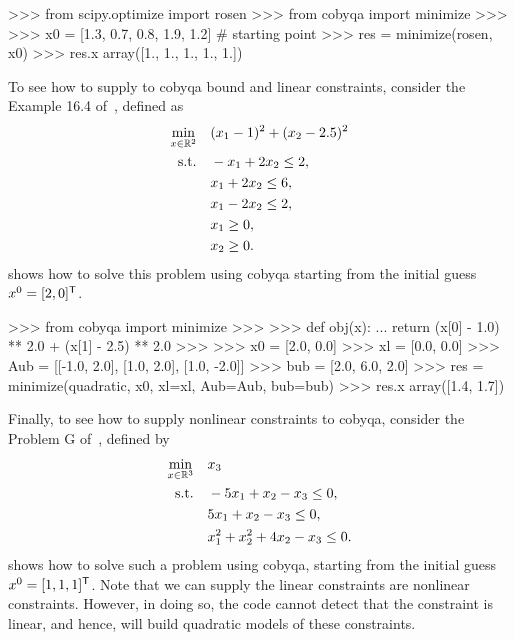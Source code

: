 \begin{lstpython}[%
    caption=Solving the Rosenbrock problem using \gls{cobyqa},
    label=lst:cobyqa-rosenbrock,
]
    >>> from scipy.optimize import rosen
    >>> from cobyqa import minimize
    >>>
    >>> x0 = [1.3, 0.7, 0.8, 1.9, 1.2]  # starting point
    >>> res = minimize(rosen, x0)
    >>> res.x
    array([1., 1., 1., 1., 1.]) 
\end{lstpython}

To see how to supply to \gls{cobyqa} bound and linear constraints, consider the Example 16.4 of~\cite{Nocedal_Wright_2006}, defined as
\begin{align*}
    \min_{\iter \in \R^2}   & \quad (\iter_1 - 1)^2 + (\iter_2 - 2.5)^2\\
    \text{s.t.}             & \quad -\iter_1 + 2 \iter_2 \le 2,\\
                            & \quad \iter_1 + 2 \iter_2 \le 6,\\
                            & \quad \iter_1 - 2 \iter_2 \le 2,\\
                            & \quad \iter_1 \ge 0,\\
                            & \quad \iter_2 \ge 0.
\end{align*}
 shows how to solve this problem using \gls{cobyqa} starting from the initial guess~$\iter[0] = [2, 0]^{\T}$.

\begin{lstpython}[%
    caption=An example of \gls{cobyqa} with linear constraints,
    label=lst:cobyqa-bound-linear,
]
    >>> from cobyqa import minimize
    >>>
    >>> def obj(x):
    ...     return (x[0] - 1.0) ** 2.0 + (x[1] - 2.5) ** 2.0
    >>>
    >>> x0 = [2.0, 0.0]
    >>> xl = [0.0, 0.0]
    >>> Aub = [[-1.0, 2.0], [1.0, 2.0], [1.0, -2.0]]
    >>> bub = [2.0, 6.0, 2.0]
    >>> res = minimize(quadratic, x0, xl=xl, Aub=Aub, bub=bub)
    >>> res.x
    array([1.4, 1.7])
\end{lstpython}

Finally, to see how to supply nonlinear constraints to \gls{cobyqa}, consider the Problem G of~\cite{Powell_1994}, defined by
\begin{align*}
    \min_{\iter \in \R^3}   & \quad \iter_3\\
    \text{s.t.}             & \quad -5 \iter_1 + \iter_2 - \iter_3 \le 0,\\
                            & \quad 5 \iter_1 + \iter_2 - \iter_3 \le 0,\\
                            & \quad \iter_1^2 + \iter_2^2 + 4 \iter_2 - \iter_3 \le 0.
\end{align*}
 shows how to solve such a problem using \gls{cobyqa}, starting from the initial guess~$\iter[0] = [1, 1, 1]^{\T}$.
Note that we can supply the linear constraints are nonlinear constraints.
However, in doing so, the code cannot detect that the constraint is linear, and hence, will build quadratic models of these constraints.

